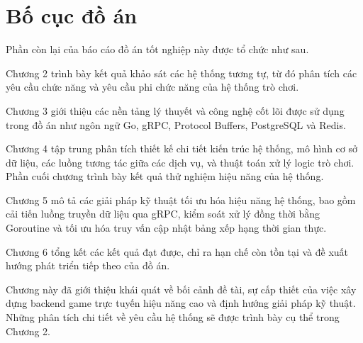 \documentclass[../Project.tex]{subfiles}
\begin{document}
\section{Bố cục đồ án}
Phần còn lại của báo cáo đồ án tốt nghiệp này được tổ chức như sau.

Chương 2 trình bày kết quả khảo sát các hệ thống tương tự, từ đó phân tích các yêu cầu chức năng và yêu cầu phi chức năng của hệ thống trò chơi.

Chương 3 giới thiệu các nền tảng lý thuyết và công nghệ cốt lõi được sử dụng trong đồ án như ngôn ngữ Go, gRPC, Protocol Buffers, PostgreSQL và Redis.

Chương 4 tập trung phân tích thiết kế chi tiết kiến trúc hệ thống, mô hình cơ sở dữ liệu, các luồng tương tác giữa các dịch vụ, và thuật toán xử lý logic trò chơi. Phần cuối chương trình bày kết quả thử nghiệm hiệu năng của hệ thống.

Chương 5 mô tả các giải pháp kỹ thuật tối ưu hóa hiệu năng hệ thống, bao gồm cải tiến luồng truyền dữ liệu qua gRPC, kiểm soát xử lý đồng thời bằng Goroutine và tối ưu hóa truy vấn cập nhật bảng xếp hạng thời gian thực.

Chương 6 tổng kết các kết quả đạt được, chỉ ra hạn chế còn tồn tại và đề xuất hướng phát triển tiếp theo của đồ án.

\vspace{0.5cm}
Chương này đã giới thiệu khái quát về bối cảnh đề tài, sự cấp thiết của việc xây dựng backend game trực tuyến hiệu năng cao và định hướng giải pháp kỹ thuật. Những phân tích chi tiết về yêu cầu hệ thống sẽ được trình bày cụ thể trong Chương 2.
\end{document}
